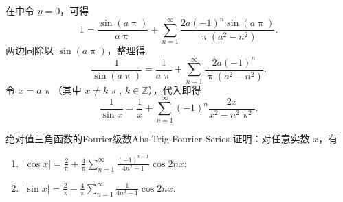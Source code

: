 \begin{myproof}

    在中令 $y = 0$，可得
    \begin{equation}\label{eq:sin-sub}
        1 = \frac{\sin(a\uppi)}{a\uppi} + \sum_{n=1}^{\infty} \frac{2a(-1)^n \sin(a\uppi)}{\uppi (a^2 - n^2)}.
    \end{equation}
    两边同除以 $\sin(a\uppi)$，整理得
    \begin{equation}\label{eq:csc-a}
        \frac{1}{\sin(a\uppi)} = \frac{1}{a\uppi} + \sum_{n=1}^{\infty} \frac{2a(-1)^n}{\uppi (a^2 - n^2)}.
    \end{equation}
    令 $x = a\uppi$（其中 $x \neq k\uppi, \, k \in \mathbb{Z}$），代入即得
    \begin{equation}\label{eq:csc-result}
        \frac{1}{\sin x} = \frac{1}{x} + \sum_{n=1}^{\infty} (-1)^n \frac{2x}{x^2 - n^2 \uppi^2}.
    \end{equation}
\end{myproof}

\begin{problem}{绝对值三角函数的Fourier级数}{Abs-Trig-Fourier-Series}
    证明：对任意实数 $x$，有
    \begin{enumerate}
        \item $|\cos x| = \frac{2}{\uppi} + \frac{4}{\uppi} \sum_{n=1}^{\infty} \frac{(-1)^{n-1}}{4n^2 - 1} \cos 2nx$;
        \item $|\sin x| = \frac{2}{\uppi} - \frac{4}{\uppi} \sum_{n=1}^{\infty} \frac{1}{4n^2 - 1} \cos 2nx$.
    \end{enumerate}
\end{problem}

